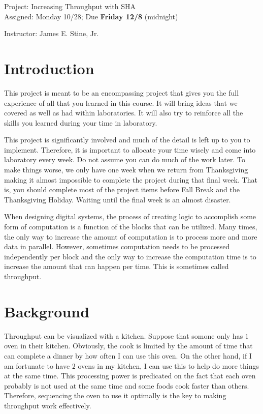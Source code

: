 \documentclass{article}
\newcommand{\myassignment}{Project: Increasing Throughput with SHA}
\newcommand{\myduedate}{Assigned: Monday 10/28; Due \textbf{Friday 12/8} (midnight)}
\newcommand{\myinstructor}{Instructor: James E. Stine, Jr.}
\begin{document}
\begin{center}
  {\huge \myassignment} \\
  {\large \myduedate} \\
  \begin{flushright}
  \myinstructor \\
  \end{flushright}
\end{center}

\section{Introduction}

This project is meant to be an encompassing project that gives you the
full experience of all that you learned in this course.  It will bring
ideas that we covered as well as had within laboratories.  It will
also try to reinforce all the skills you learned during your time in
laboratory.

This project is significantly involved and much of the detail is left
up to you to implement.  Therefore, it is important to allocate your
time wisely and come into laboratory every week.  Do not assume you
can do much of the work later.  To make things worse, we only have one
week when we return from Thanksgiving making it almost impossible to
complete the project during that final week.  That is, you should
complete most of the project items before Fall Break and the
Thanksgiving Holiday.  Waiting until the final week is an almost
disaster.  

When designing digital systems, the process of creating logic to
accomplish some form of computation is a function of the blocks that
can be utilized.  Many times, the only way to increase the amount of
computation is to process more and more data in parallel.  However,
sometimes computation needs to be processed independently per block
and the only way to increase the computation time is to increase the
amount that can happen per time.  This is sometimes called
throughput.


\section{Background}

Throughput can be visualized with a kitchen.  Suppose that somone only
has $1$ oven in their kitchen.  Obviously, the cook is limited by the
amount of time that can complete a dinner by how often I can use this
oven.  On the other hand, if I am fortunate to have $2$ ovens in my
kitchen, I can use this to help do more things at the same time.  This
processing power is predicated on the fact that each oven probably is
not used at the same time and some foods cook faster than others.
Therefore, sequencing the oven to use it optimally is the key to
making throughput work effectively.
\end{document}
